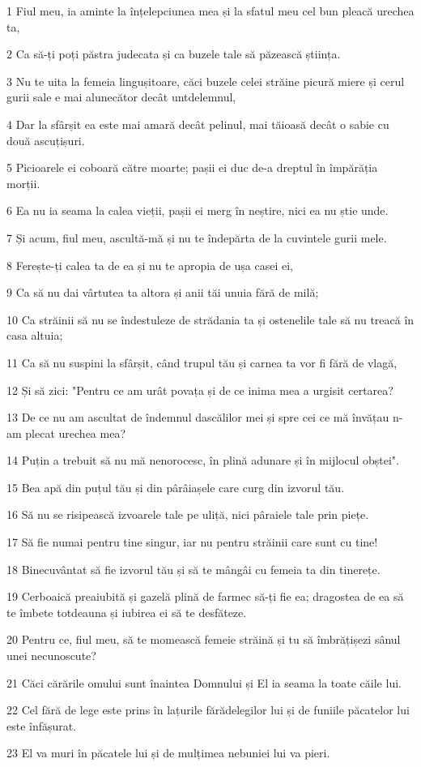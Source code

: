 \par 1 Fiul meu, ia aminte la înțelepciunea mea și la sfatul meu cel bun pleacă urechea ta,
\par 2 Ca să-ți poți păstra judecata și ca buzele tale să păzească știința.
\par 3 Nu te uita la femeia lingușitoare, căci buzele celei străine picură miere și cerul gurii sale e mai alunecător decât untdelemnul,
\par 4 Dar la sfârșit ea este mai amară decât pelinul, mai tăioasă decât o sabie cu două ascuțișuri.
\par 5 Picioarele ei coboară către moarte; pașii ei duc de-a dreptul în împărăția morții.
\par 6 Ea nu ia seama la calea vieții, pașii ei merg în neștire, nici ea nu știe unde.
\par 7 Și acum, fiul meu, ascultă-mă și nu te îndepărta de la cuvintele gurii mele.
\par 8 Ferește-ți calea ta de ea și nu te apropia de ușa casei ei,
\par 9 Ca să nu dai vârtutea ta altora și anii tăi unuia fără de milă;
\par 10 Ca străinii să nu se îndestuleze de strădania ta și ostenelile tale să nu treacă în casa altuia;
\par 11 Ca să nu suspini la sfârșit, când trupul tău și carnea ta vor fi fără de vlagă,
\par 12 Și să zici: "Pentru ce am urât povața și de ce inima mea a urgisit certarea?
\par 13 De ce nu am ascultat de îndemnul dascălilor mei și spre cei ce mă învățau n-am plecat urechea mea?
\par 14 Puțin a trebuit să nu mă nenorocesc, în plină adunare și în mijlocul obștei".
\par 15 Bea apă din puțul tău și din pârâiașele care curg din izvorul tău.
\par 16 Să nu se risipească izvoarele tale pe uliță, nici pâraiele tale prin piețe.
\par 17 Să fie numai pentru tine singur, iar nu pentru străinii care sunt cu tine!
\par 18 Binecuvântat să fie izvorul tău și să te mângâi cu femeia ta din tinerețe.
\par 19 Cerboaică preaiubită și gazelă plină de farmec să-ți fie ea; dragostea de ea să te îmbete totdeauna și iubirea ei să te desfăteze.
\par 20 Pentru ce, fiul meu, să te momească femeie străină și tu să îmbrățișezi sânul unei necunoscute?
\par 21 Căci cărările omului sunt înaintea Domnului și El ia seama la toate căile lui.
\par 22 Cel fără de lege este prins în lațurile fărădelegilor lui și de funiile păcatelor lui este înfășurat.
\par 23 El va muri în păcatele lui și de mulțimea nebuniei lui va pieri.

